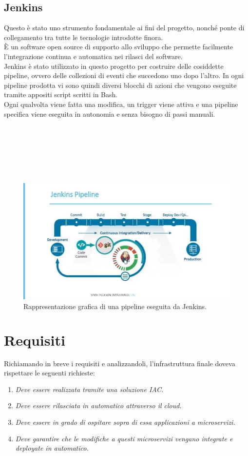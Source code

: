 \documentclass[a4paper,12pt]{report}
\begin{document}
\subsection{Jenkins}
Questo è stato uno strumento fondamentale ai fini del progetto, nonché ponte di collegamento tra tutte le tecnologie introdotte finora. \\
È un software open source di supporto allo sviluppo che permette facilmente l'integrazione continua e automatica nei rilasci del software.\cite{jenkins}\\
Jenkins è stato utilizzato in questo progetto per costruire delle cosiddette pipeline, ovvero delle collezioni di eventi che succedono uno dopo l'altro. 
In ogni pipeline prodotta vi sono quindi diversi blocchi di azioni che vengono eseguite tramite appositi script scritti in Bash. \\
Ogni qualvolta viene fatta una modifica, un trigger viene attiva e una pipeline specifica viene eseguita in autonomia e senza bisogno di passi manuali. \\ \\ \\ \\ \\ \\ \\
\begin{figure}[h]
	\includegraphics[width=1.0\textwidth]{jenkins}
    \caption{Rappresentazione grafica di una pipeline eseguita da Jenkins. \cite{jenkinsimg}}
    \label{fig:jenkins}
\end{figure}
\section{Requisiti}
Richiamando in breve i requisiti e analizzandoli, l'infrastruttura finale doveva rispettare le seguenti richieste:\\
\begin{enumerate}
\item \textit{Deve essere realizzata tramite una soluzione IAC.}
\item \textit{Deve essere rilasciata in automatico attraverso il cloud.}
\item \textit{Deve essere in grado di ospitare sopra di essa applicazioni a microservizi.}
\item \textit{Deve garantire che le modifiche a questi microservizi vengano integrate e deployate in automatico.}
\end{enumerate}
\end{document}
